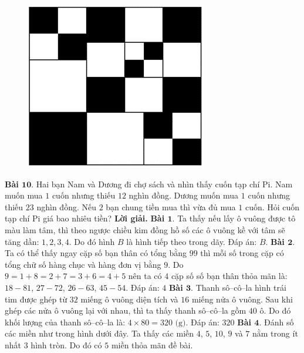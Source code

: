\begin{multicols}{2}
	\begin{figure}[H]
		\vspace*{-5pt}
		\centering
		\captionsetup{labelformat= empty, justification=centering}
		\includegraphics[width= 0.7\linewidth]{6}
		\vspace*{-10pt}
	\end{figure}
	\textbf{\color{toancuabi}Bài $\pmb{10.}$} Hai bạn Nam và Dương đi chợ sách và nhìn thấy cuốn tạp chí Pi. Nam muốn mua $1$ cuốn nhưng thiếu $12$ nghìn đồng. Dương muốn mua $1$ cuốn nhưng thiếu $23$ nghìn đồng. Nếu $2$ bạn chung tiền mua thì vừa đủ mua $1$ cuốn. Hỏi cuốn tạp chí Pi giá bao nhiêu tiền?
	\vskip 0.1cm
	\textbf{\color{toancuabi}Lời giải.}
	\vskip 0.1cm
	\textbf{\color{toancuabi}Bài $\pmb{1.}$} Ta thấy nếu lấy ô vuông được tô màu làm tâm, thì theo ngược chiều kim đồng hồ số các ô vuông kề với tâm sẽ tăng dần: $1,2,3,4$. Do đó hình $B$ là hình tiếp theo trong dãy.
	\vskip 0.1cm
	Đáp án: $B$.
	\vskip 0.1cm
	\textbf{\color{toancuabi}Bài $\pmb{2.}$} Ta có thể thấy ngay cặp số bạn thân có tổng bằng $99$ thì mỗi số trong cặp có tổng chữ số hàng chục và hàng đơn vị bằng $9$. Do $9 = 1+8 = 2+7 = 3+6 = 4+5$ nên ta có $4$ cặp số số bạn thân thỏa mãn là: $18-81$, $27-72$, $26-63$, $45-54$.
	\vskip 0.1cm
	Đáp án: $4$
	\vskip 0.1cm
	\textbf{\color{toancuabi}Bài $\pmb{3.}$} Thanh sô--cô--la hình trái tim được ghép từ $32$ miếng ô vuông diện tích và $16$ miếng nửa ô vuông. Sau khi ghép các nửa ô vuông lại với nhau, thì ta thấy thanh sô--cô--la gồm $40$ ô. Do đó khối lượng của thanh sô--cô--la là: $4\times 80=320 \text{ (g)}$.
	\vskip 0.1cm
	Đáp án: $320$
	\vskip 0.1cm
	\textbf{\color{toancuabi}Bài $\pmb{4.}$} Đánh số các miền như trong hình dưới đây. Ta thấy các miền $4$, $5$, $10$, $9$ và $7$ nằm trong ít nhất $3$ hình tròn. Do đó có $5$ miền thỏa mãn đề bài.

\end{multicols}

